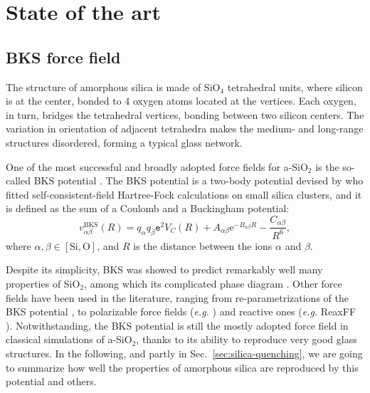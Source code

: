 \section{State of the art}  \label{sec:silica-state-of-the-art}

\subsection{BKS force field}  \label{sec:silica-force-field}
The structure of amorphous silica is made of SiO$_4$ tetrahedral units, where silicon is at the center, bonded to 4 oxygen atoms located at the vertices. Each oxygen, in turn, bridges the tetrahedral vertices, bonding between two silicon centers. The variation in orientation of adjacent tetrahedra makes the medium- and long-range structures disordered, forming a typical glass network.

One of the most successful and broadly adopted force fields for a-SiO$_2$ is the so-called BKS potential \cite{Silica-BKS-1990}. 
The BKS potential is a two-body potential devised by \citeauthor*{Silica-BKS-1990} who fitted self-consistent-field Hartree-Fock calculations on small silica clusters, and it is defined as the sum of a Coulomb and a Buckingham potential:
\begin{equation}
    v_{\alpha\beta}^{\mathrm{BKS}}(R) = q_\alpha q_\beta \mathtt{e}^2 V_C(R) + A_{\alpha\beta}\mathrm{e}^{-B_{\alpha\beta}R} - \frac{C_{\alpha\beta}}{R^6}, \label{eq:BKS}
\end{equation}
where $\alpha,\beta \in [\text{Si},\text{O}]$, and $R$ is the distance between the ions $\alpha$ and $\beta$. 

Despite its simplicity, BKS was showed to predict remarkably well many properties of SiO$_2$, among which its complicated phase diagram \cite{Saika2004}. 
Other force fields have been used in the literature, ranging from re-parametrizations of the BKS potential \cite{Carre2008}, to polarizable force fields (\emph{e.g.} \citet{Tangney2002}) and reactive ones (\emph{e.g.} ReaxFF \cite{Yuan2001}). 
Notwithstanding, the BKS potential is still the mostly adopted force field in classical simulations of a-SiO$_2$, thanks to its ability to reproduce very good glass structures. 
In the following, and partly in Sec.~\ref{sec:silica-quenching}, we are going to summarize how well the properties of amorphous silica are reproduced by this potential and others.


